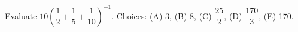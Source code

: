 Evaluate $10(\dfrac{1}{2}+\dfrac{1}{5}+\dfrac{1}{10})^{-1}$. Choices: (A) 3, (B) 8, (C) $\dfrac{25}{2}$, (D) $\dfrac{170}{3}$, (E) 170.

